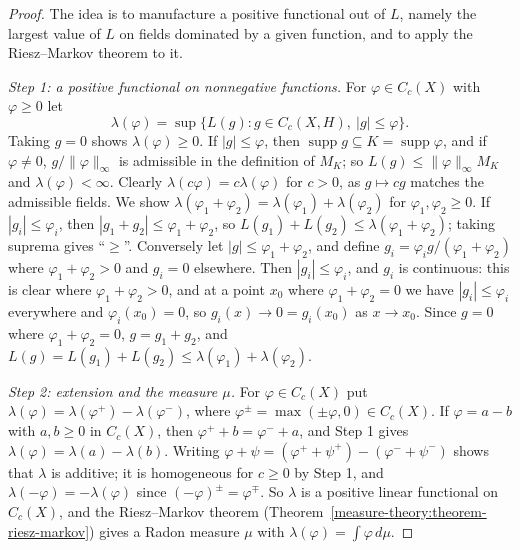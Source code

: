 \begin{proof}
The idea is to manufacture a positive functional out of $L$, namely the largest value of $L$ on fields dominated by a given function, and to apply the Riesz--Markov theorem to it.

\emph{Step 1: a positive functional on nonnegative functions.} For $\varphi \in C_c(X)$ with $\varphi \geq 0$ let
\[
\lambda(\varphi) = \sup\bigl\{L(g) : g \in C_c(X, H),\ |g| \leq \varphi\bigr\}.
\]
Taking $g = 0$ shows $\lambda(\varphi) \geq 0$. If $|g| \leq \varphi$, then $\operatorname{supp}g \subseteq K = \operatorname{supp}\varphi$, and if $\varphi \neq 0$, $g/\|\varphi\|_\infty$ is admissible in the
definition of $M_K$; so $L(g) \leq \|\varphi\|_\infty M_K$ and $\lambda(\varphi) < \infty$. Clearly $\lambda(c\varphi) = c\lambda(\varphi)$ for $c > 0$, as $g \mapsto cg$ matches the admissible fields. We
show $\lambda(\varphi_1 + \varphi_2) = \lambda(\varphi_1) + \lambda(\varphi_2)$ for $\varphi_1, \varphi_2 \geq 0$. If $|g_i| \leq \varphi_i$, then $|g_1 + g_2| \leq \varphi_1 + \varphi_2$, so
$L(g_1) + L(g_2) \leq \lambda(\varphi_1 + \varphi_2)$; taking suprema gives ``$\geq$''. Conversely let $|g| \leq \varphi_1 + \varphi_2$, and define $g_i = \varphi_ig/(\varphi_1 + \varphi_2)$ where
$\varphi_1 + \varphi_2 > 0$ and $g_i = 0$ elsewhere. Then $|g_i| \leq \varphi_i$, and $g_i$ is continuous: this is clear where $\varphi_1 + \varphi_2 > 0$, and at a point $x_0$ where
$\varphi_1 + \varphi_2 = 0$ we have $|g_i| \leq \varphi_i$ everywhere and $\varphi_i(x_0) = 0$, so $g_i(x) \to 0 = g_i(x_0)$ as $x \to x_0$. Since $g = 0$ where $\varphi_1 + \varphi_2 = 0$, $g = g_1 + g_2$, and
$L(g) = L(g_1) + L(g_2) \leq \lambda(\varphi_1) + \lambda(\varphi_2)$.

\emph{Step 2: extension and the measure $\mu$.} For $\varphi \in C_c(X)$ put $\lambda(\varphi) = \lambda(\varphi^+) - \lambda(\varphi^-)$, where $\varphi^\pm = \max(\pm\varphi, 0) \in C_c(X)$. If
$\varphi = a - b$ with $a, b \geq 0$ in $C_c(X)$, then $\varphi^+ + b = \varphi^- + a$, and Step 1 gives $\lambda(\varphi) = \lambda(a) - \lambda(b)$. Writing
$\varphi + \psi = (\varphi^+ + \psi^+) - (\varphi^- + \psi^-)$ shows that $\lambda$ is additive; it is homogeneous for $c \geq 0$ by Step 1, and $\lambda(-\varphi) = -\lambda(\varphi)$ since
$(-\varphi)^\pm = \varphi^\mp$. So $\lambda$ is a positive linear functional on $C_c(X)$, and the Riesz--Markov theorem (Theorem~\ref{measure-theory:theorem-riesz-markov}) gives a Radon measure $\mu$ with
$\lambda(\varphi) = \int\varphi\,d\mu$.


\end{proof}
